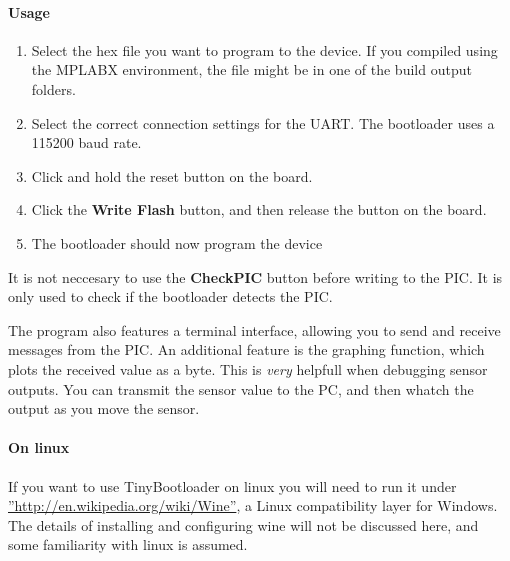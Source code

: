 \documentclass{article}
\begin{document}
\paragraph{Usage}
\begin{enumerate}
\item Select the hex file you want to program to the device. If you compiled using the MPLABX environment, the file might be in one of the build output folders.
\item Select the correct connection settings for the UART. The bootloader uses a 115200 baud rate.
\item Click and hold the reset button on the board. 
\item Click the \textbf{Write Flash} button, and then release the button on the board.
\item The bootloader should now program the device
\end{enumerate}
It is not neccesary to use the \textbf{CheckPIC} button before writing to the PIC. It is only used to check if the bootloader detects the PIC.

The program also features a terminal interface, allowing you to send and receive messages from the PIC. An additional feature is the graphing function, which plots the received value as a byte. This is \textit{very} helpfull when debugging sensor outputs. You can transmit the sensor value to the PC, and then whatch the output as you move the sensor. 
\paragraph{On linux}
If you want to use TinyBootloader on linux you will need to run it under \hyperref[Wine]{''http://en.wikipedia.org/wiki/Wine''}, a Linux compatibility layer for Windows. The details of installing and configuring wine will not be discussed here, and some familiarity with linux is assumed.
\end{document}
